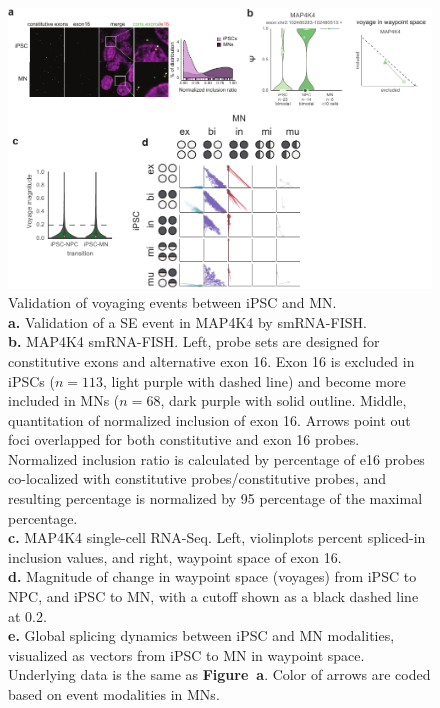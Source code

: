 \begin{figure}[h]
  \centering
  \includegraphics[width=5.8in]{figures/bonvoyage_supplementary.pdf}
  \caption[Validation of voyaging events between iPSC and MN.]{Validation of voyaging events between iPSC and MN.\\
\textbf{a.} Validation of a SE event in MAP4K4 by smRNA-FISH.\\
\textbf{b.} MAP4K4 smRNA-FISH. Left, probe sets are designed for constitutive exons and alternative exon 16. Exon 16 is excluded in iPSCs ($n = 113$, light purple with dashed line) and become more included in MNs ($n = 68$, dark purple with solid outline. Middle, quantitation of normalized inclusion of exon 16. Arrows point out foci overlapped for both constitutive and exon 16 probes. Normalized inclusion ratio is calculated by percentage of e16 probes co-localized with constitutive probes/constitutive probes, and resulting percentage is normalized by 95 percentage of the maximal percentage.\\
\textbf{c.} MAP4K4 single-cell RNA-Seq. Left, violinplots percent spliced-in inclusion values, and right, waypoint space of exon 16.\\
\textbf{d.} Magnitude of change in waypoint space (voyages) from iPSC to NPC, and iPSC to MN, with a cutoff shown as a black dashed line at 0.2.\\
\textbf{e.} Global splicing dynamics between iPSC and MN modalities, visualized as vectors from iPSC to MN  in waypoint space. Underlying data is the same as \textbf{Figure~a}. Color of arrows are coded based on event modalities in MNs.
}
\label{fig:bonvoyage_supplementary}
\end{figure}


